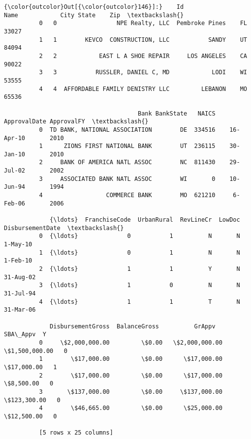 \documentclass[11pt]{article}
\begin{document}
\begin{Verbatim}[commandchars=\\\{\}]
{\color{outcolor}Out[{\color{outcolor}146}]:}    Id                            Name            City State    Zip  \textbackslash{}
          0   0                 NPE Realty, LLC  Pembroke Pines    FL  33027   
          1   1        KEVCO  CONSTRUCTION, LLC           SANDY    UT  84094   
          2   2            EAST L A SHOE REPAIR     LOS ANGELES    CA  90022   
          3   3           RUSSLER, DANIEL C, MD            LODI    WI  53555   
          4   4  AFFORDABLE FAMILY DENISTRY LLC         LEBANON    MO  65536   
          
                                      Bank BankState   NAICS ApprovalDate ApprovalFY  \textbackslash{}
          0  TD BANK, NATIONAL ASSOCIATION        DE  334516    16-Apr-10       2010   
          1      ZIONS FIRST NATIONAL BANK        UT  236115    30-Jan-10       2010   
          2     BANK OF AMERICA NATL ASSOC        NC  811430    29-Jul-02       2002   
          3     ASSOCIATED BANK NATL ASSOC        WI       0    10-Jun-94       1994   
          4                  COMMERCE BANK        MO  621210     6-Feb-06       2006   
          
             {\ldots}  FranchiseCode  UrbanRural  RevLineCr  LowDoc  DisbursementDate  \textbackslash{}
          0  {\ldots}              0           1          N       N          1-May-10   
          1  {\ldots}              0           1          N       N          1-Feb-10   
          2  {\ldots}              1           1          Y       N         31-Aug-02   
          3  {\ldots}              1           0          N       N         31-Jul-94   
          4  {\ldots}              1           1          T       N         31-Mar-06   
          
             DisbursementGross  BalanceGross          GrAppv        SBA\_Appv  Y  
          0     \$2,000,000.00         \$0.00   \$2,000,000.00   \$1,500,000.00   0  
          1        \$17,000.00         \$0.00      \$17,000.00      \$17,000.00   1  
          2        \$17,000.00         \$0.00      \$17,000.00       \$8,500.00   0  
          3       \$137,000.00         \$0.00     \$137,000.00     \$123,300.00   0  
          4        \$46,665.00         \$0.00      \$25,000.00      \$12,500.00   0  
          
          [5 rows x 25 columns]
\end{Verbatim}
            
\end{document}

